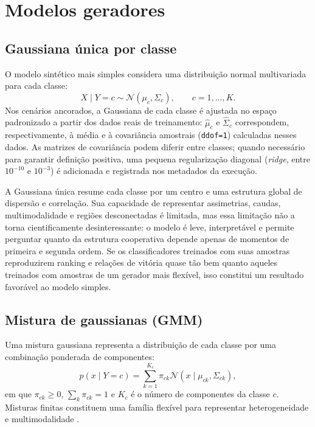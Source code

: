 \section{Modelos geradores}

\subsection{Gaussiana única por classe}

O modelo sintético mais simples considera uma distribuição normal multivariada para cada classe:
\begin{equation}
  X\mid Y=c \sim \mathcal{N}(\mu_c,\Sigma_c),
  \qquad c=1,\ldots,K.
  \label{eq:class-gaussian}
\end{equation}
Nos cenários ancorados, a Gaussiana de cada classe é ajustada no espaço padronizado a partir dos dados reais de treinamento: $\widehat{\mu}_c$ e $\widehat{\Sigma}_c$ correspondem, respectivamente, à média e à covariância amostrais (\texttt{ddof=1}) calculadas nesses dados. As matrizes de covariância podem diferir entre classes; quando necessário para garantir definição positiva, uma pequena regularização diagonal (\emph{ridge}, entre $10^{-10}$ e $10^{-3}$) é adicionada e registrada nos metadados da execução.

A Gaussiana única resume cada classe por um centro e uma estrutura global de dispersão e correlação. Sua capacidade de representar assimetrias, caudas, multimodalidade e regiões desconectadas é limitada, mas essa limitação não a torna cientificamente desinteressante: o modelo é leve, interpretável e permite perguntar quanto da estrutura cooperativa depende apenas de momentos de primeira e segunda ordem. Se os classificadores treinados com suas amostras reproduzirem ranking e relações de vitória quase tão bem quanto aqueles treinados com amostras de um gerador mais flexível, isso constitui um resultado favorável ao modelo simples.

\subsection{Mistura de gaussianas (GMM)}

Uma mistura gaussiana representa a distribuição de cada classe por uma combinação ponderada de componentes:
\begin{equation}
  p(x\mid Y=c)
  =
  \sum_{k=1}^{K_c}\pi_{ck}
  \mathcal{N}(x\mid\mu_{ck},\Sigma_{ck}),
  \label{eq:gmm}
\end{equation}
em que $\pi_{ck}\geq 0$, $\sum_k\pi_{ck}=1$ e $K_c$ é o número de componentes da classe $c$. Misturas finitas constituem uma família flexível para representar heterogeneidade e multimodalidade \cite{mclachlan2000}.

